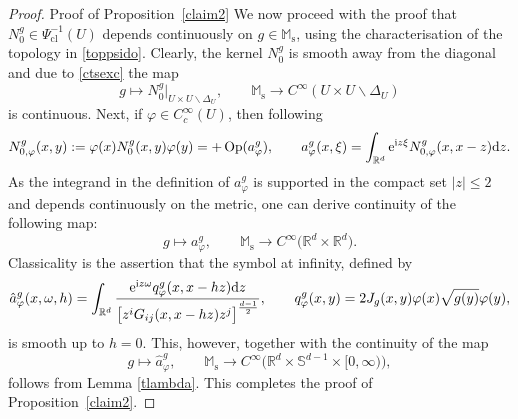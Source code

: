 \documentclass[10pt,a4paper]{amsart}
\numberwithin{equation}{section}
\theoremstyle{definition}
\newcommand{\R}{\mathbb{R}} %
\newcommand{\M}{\mathbb{M}}
\newcommand{\Ms}{\M_{\mathrm{s}}}
\newcommand{\1}{{\bf 1}}
\DeclareMathOperator{\Op}{Op}
\newcommand{\cl}{\mathrm{cl}}
\begin{document}
\begin{proof}{Proof of Proposition~\ref{claim2}}
We now proceed with the proof that $N^g_0 \in \Psi^{-1}_\cl(U)$ depends continuously on $g\in \Ms$, using the characterisation of the topology in \eqref{toppsido}.
Clearly, the kernel $N^g_0$ is smooth away from the diagonal and due to \eqref{ctsexc} the map
\[
	g\mapsto N^g_0\vert_{U\times U\backslash \Delta_U},\qquad \Ms\rightarrow C^\infty(U\times U\backslash \Delta_U)
\]
is continuous. Next, if $\varphi\in C_c^\infty(U)$, then following \cite[Chapter 8.1]{PSU23}
\[
	N^g_{0,\varphi}(x,y):=\varphi(x)N^g_0(x,y)\varphi(y) = +
	\Op(a^g_\varphi),\qquad a_\varphi^g(x,\xi)=\int_{\R^d} {\rm e}^{{\rm i}z\xi} N^g_{0,\varphi}(x,x-z) {\rm d}z.
\]
As the integrand in the definition of $a^g_\varphi$ is supported in the compact set $|z|\le 2$ and depends continuously on the metric, one can derive continuity of the following map:
\[
	g\mapsto a^g_\varphi,\qquad \Ms\rightarrow C^\infty\bigl(\R^d\times \R^d\bigr).
\]
Classicality is the assertion that the symbol at infinity, defined by
\[
\hat a_\varphi^g(x,\omega,h)=\int_{\R^d} \frac{{\rm e}^{{\rm i}z\omega} q_\varphi^g(x,x-hz) {\rm d}z}{\big[z^iG_{ij}(x,x-hz)z^j\big]^{\frac{d-1}2}}, \qquad q_\varphi^g(x,y) = 2 J_g(x,y)\varphi(x) \sqrt{g(y)} \varphi(y),
\]
is smooth up to $h=0$. This, however, together with the continuity of the map
\[
	g\mapsto \hat a_\varphi^g,\qquad \mathbb M_\mathrm{s} \to C^\infty\bigl(\R^d\times \mathbb S^{d-1} \times [0,\infty)\bigr),
\]
follows from Lemma \ref{tlambda}. This completes the proof of Proposition~\ref{claim2}.
\end{proof}
\end{document}
